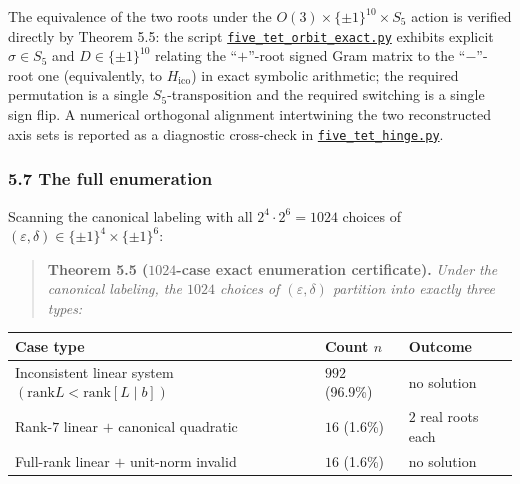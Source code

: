 \documentclass[
]{article}
\begin{document}
The equivalence of the two roots under the
\(O(3) \times \{\pm 1\}^{10} \times S_5\) action is verified directly by
Theorem 5.5: the script
\href{../scripts/five_tet_orbit_exact.py}{\texttt{five\_tet\_orbit\_exact.py}}
exhibits explicit \(\sigma \in S_5\) and \(D \in \{\pm 1\}^{10}\)
relating the ``\(+\)''-root signed Gram matrix to the ``\(-\)''-root one
(equivalently, to \(H_{\mathrm{ico}}\)) in exact symbolic arithmetic;
the required permutation is a single \(S_5\)-transposition and the
required switching is a single sign flip. A numerical orthogonal
alignment intertwining the two reconstructed axis sets is reported as a
diagnostic cross-check in
\href{../scripts/five_tet_hinge.py}{\texttt{five\_tet\_hinge.py}}.

\subsubsection{5.7 The full enumeration}\label{the-full-enumeration}

Scanning the canonical labeling with all \(2^4 \cdot 2^6 = 1024\)
choices of \((\varepsilon, \delta) \in \{\pm 1\}^4 \times \{\pm 1\}^6\):

\begin{quote}
\textbf{Theorem 5.5 (\(1024\)-case exact enumeration certificate).}
\emph{Under the canonical labeling, the \(1024\) choices of
\((\varepsilon, \delta)\) partition into exactly three types:}
\end{quote}

\begin{longtable}[]{@{}
  >{\raggedright\arraybackslash}p{}
  >{\raggedright\arraybackslash}p{}
  >{\raggedright\arraybackslash}p{}@{}}
\toprule\noalign{}
\begin{minipage}[b]{\linewidth}\raggedright
Case type
\end{minipage} & \begin{minipage}[b]{\linewidth}\raggedright
Count \(n\)
\end{minipage} & \begin{minipage}[b]{\linewidth}\raggedright
Outcome
\end{minipage} \\
\midrule\noalign{}
\endhead
\bottomrule\noalign{}
\endlastfoot
Inconsistent linear system
\((\mathrm{rank} L < \mathrm{rank}[L\mid b])\) & \(992\) (96.9\%) & no
solution \\
Rank-\(7\) linear \(+\) canonical quadratic & \(16\) (1.6\%) & \(2\)
real roots each \\
Full-rank linear \(+\) unit-norm invalid & \(16\) (1.6\%) & no
solution \\
\end{longtable}
\end{document}
